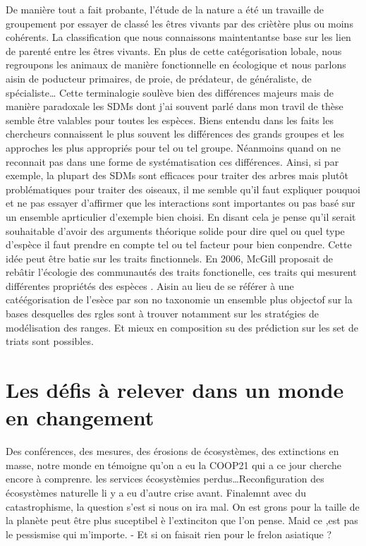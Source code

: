 De manière tout a fait probante, l'étude de la nature a été un travaille
de groupement por essayer de classé les êtres vivants par des criètère
plus ou moins cohérents. La classification que nous connaissons
maintentantse base sur les lien de parenté entre les êtres vivants. En
plus de cette catégorisation lobale, nous regroupons les animaux de
manière fonctionnelle en écologique et nous parlons aisin de poducteur
primaires, de proie, de prédateur, de généraliste, de
spécialiste\ldots{} Cette terminalogie soulève bien des différences
majeurs mais de manière paradoxale les SDMs dont j'ai souvent parlé dans
mon travil de thèse semble être valables pour toutes les espèces. Biens
entendu dans les faits les chercheurs connaissent le plus souvent les
différences des grands groupes et les approches les plus appropriés pour
tel ou tel groupe. Néanmoins quand on ne reconnait pas dans une forme de
systématisation ces différences. Ainsi, si par exemple, la plupart des
SDMs sont efficaces pour traiter des arbres mais plutôt problématiques
pour traiter des oiseaux, il me semble qu'il faut expliquer pouquoi et
ne pas essayer d'affirmer que les interactions sont importantes ou pas
basé sur un ensemble aprticulier d'exemple bien choisi. En disant cela
je pense qu'il serait souhaitable d'avoir des arguments théorique solide
pour dire quel ou quel type d'espèce il faut prendre en compte tel ou
tel facteur pour bien conpendre. Cette idée peut être batie sur les
traits finctionnels. En 2006, McGill proposait de rebâtir l'écologie des
communautés des traits fonctionelle, ces traits qui mesurent différentes
propriétés des espèces \citep{McGill2006}. Aisin au lieu de se référer à
une catéégorisation de l'esèce par son no taxonomie un ensemble plus
objectof sur la bases desquelles des rgles sont à trouver notamment sur
les stratégies de modélisation des ranges. Et mieux en composition su
des prédiction sur les set de triats sont possibles.

\section*{Les défis à relever dans un monde en
changement}\label{les-duxe9fis-uxe0-relever-dans-un-monde-en-changement}

Des conférences, des mesures, des érosions de écosystèmes, des
extinctions en masse, notre monde en témoigne qu'on a eu la COOP21 qui a
ce jour cherche encore à comprenre. les services écosystèmies
perdus\ldots{}Reconfiguration des écosystèmes naturelle li y a eu
d'autre crise avant. Finalemnt avec du catastrophisme, la question s'est
si nous on ira mal. On est grons pour la taille de la planète peut être
plus suceptibel è l'extinciton que l'on pense. Maid ce ,est pas le
pessismise qui m'importe. - Et si on faisait rien pour le frelon
asiatique ?

